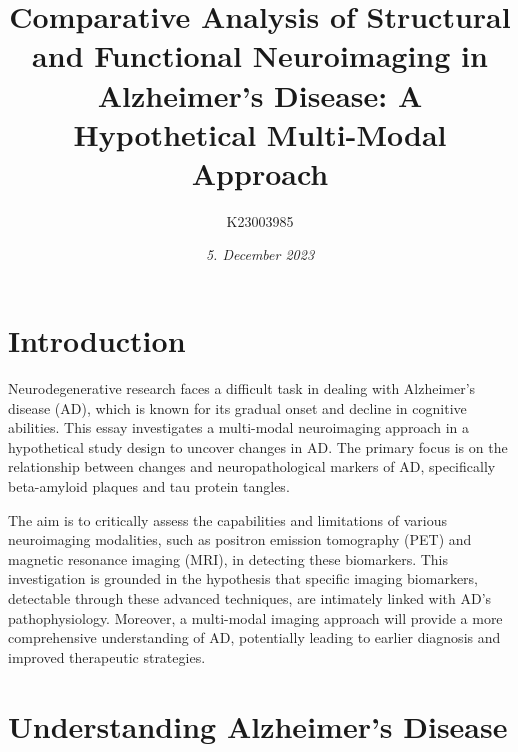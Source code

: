 \documentclass[10pt]{article}
\title{\textbf{Comparative Analysis of Structural and Functional Neuroimaging in Alzheimer's Disease: }A Hypothetical Multi-Modal Approach}
\author[ ]{K23003985}
\date{\textit{5. December 2023}}
\begin{document}

\maketitle

\doublespacing

\begin{sloppypar} %





  \section{Introduction}
  \label{sec:introduction}

  Neurodegenerative research faces a difficult task in dealing with Alzheimer's disease (AD), which is known for its gradual onset and decline in cognitive abilities. This essay investigates a multi-modal neuroimaging approach in a hypothetical study design to uncover changes in AD. The primary focus is on the relationship between changes and neuropathological markers of AD, specifically beta-amyloid plaques and tau protein tangles.

  The aim is to critically assess the capabilities and limitations of various neuroimaging modalities, such as positron emission tomography (PET) and magnetic resonance imaging (MRI), in detecting these biomarkers. This investigation is grounded in the hypothesis that specific imaging biomarkers, detectable through these advanced techniques, are intimately linked with AD's pathophysiology. Moreover, a multi-modal imaging approach will provide a more comprehensive understanding of AD, potentially leading to earlier diagnosis and improved therapeutic strategies.

  \section{Understanding Alzheimer's Disease}
  \label{sec:alzheimers-disease}


\end{sloppypar}
\end{document}
